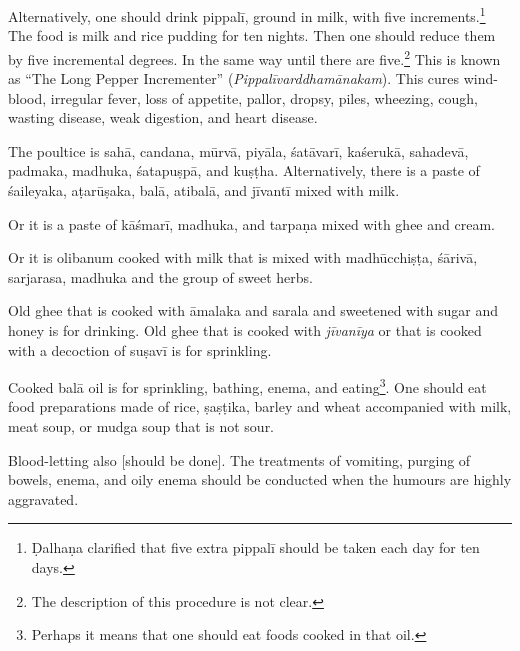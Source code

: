 \begin{translation}
Alternatively, one should drink \gls{pippalī}, ground in milk, with
five increments.\footnote{Ḍalhaṇa clarified that five extra
    \gls{pippalī} should be taken each day for ten days.} The food is milk
    and rice pudding for ten nights. Then one should reduce them by five
    incremental degrees.  In the same way until there are
    five.\footnote{The description of this procedure is not clear.} This
        is known as “The Long Pepper Incrementer”
        (\emph{Pippalīvarddhamānakam}). This cures wind-blood, irregular
        fever, loss of appetite, pallor, dropsy, piles, wheezing, cough,
        wasting disease, weak digestion, and heart disease.
        
The poultice is  \gls{sahā}, \gls{candana}, \gls{mūrvā}, \gls{piyāla},
\gls{śatāvarī}, \gls{kaśerukā}, \gls{sahadevā}, \gls{padmaka},
\gls{madhuka}, \gls{śatapuṣpā}, and \gls{kuṣṭha}. Alternatively, there
is a paste of \gls{śaileyaka}, \gls{aṭarūṣaka}, \gls{balā},
\gls{atibalā}, and \gls{jīvantī} mixed with milk.
 
 \begin{tt}
     \raggedright
     \bigskip
     
Or it is a paste of \gls{kāśmarī}, \gls{madhuka}, and \gls{tarpaṇa}
mixed with ghee and cream. 

Or it is olibanum cooked with milk that is
mixed with \gls{madhūcchiṣṭa}, \gls{śārivā}, \gls{sarjarasa},
\gls{madhuka} and the group of sweet herbs.
            
Old ghee that is cooked with \gls{āmalaka} and \gls{sarala} and
sweetened with sugar and honey is for drinking. Old ghee that is
cooked with \textit{jīvanīya} or that is cooked with a decoction of
\gls{suṣavī} is for sprinkling.
            
Cooked \gls{balā} oil is for sprinkling, bathing, enema, and
eating\footnote{Perhaps it means that one should eat foods cooked in
    that oil.}. One should eat food preparations made of rice,
    \gls{ṣaṣṭika}, barley and wheat accompanied with milk, meat soup, or
    \gls{mudga} soup that is not sour.
                
Blood-letting also [should be done]. The treatments of vomiting,
purging of bowels, enema, and oily enema should be conducted when the
humours are highly aggravated.

\item[13]


\item[14]


\end{tt}
\end{translation}

